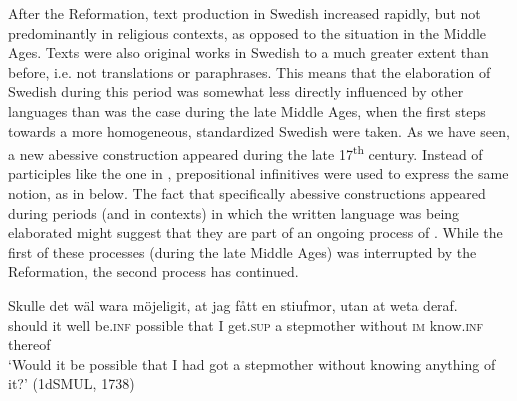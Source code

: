 \documentclass[output=paper]{langscibook}
\begin{document}
After the Reformation, text production in Swedish increased rapidly, but not predominantly in religious contexts, as opposed to the situation in the Middle Ages. Texts were also original works in Swedish to a much greater extent than before, i.e. not translations or paraphrases. This means that the elaboration of Swedish during this period was somewhat less directly influenced by other languages than was the case during the late Middle Ages, when the first steps towards a more homogeneous, standardized Swedish were taken. As we have seen, a new abessive construction appeared during the late 17\textsuperscript{th} century. Instead of participles like the one in , prepositional infinitives were used to express the same  notion, as in  below. The fact that specifically abessive constructions appeared during periods (and in contexts) in which the written language was being elaborated might suggest that they are part of an ongoing process of . While the first of these processes (during the late Middle Ages) was interrupted by the Reformation, the second process has continued. 


\ea
\label{ex:kalm:34}
 \gll Skulle det wäl wara möjeligit, at jag fått en stiufmor, utan at weta deraf.\\
should it well be.\textsc{inf} possible that I get.\textsc{sup} a stepmother without \textsc{im} know.\textsc{inf} thereof\\
\glt ‘Would it be possible that I had got a stepmother without knowing anything of it?’ (1dSMUL, 1738)
\z
\end{document}
